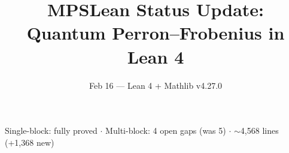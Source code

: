 \documentclass[aspectratio=169,10pt]{beamer}
\title{\textbf{MPSLean Status Update:\\Quantum Perron--Frobenius in Lean 4}}
\subtitle{{\small Feb 16 --- Lean 4 + Mathlib v4.27.0}}
\date{}
\author{}
\begin{document}
{%
\begin{frame}
    \vspace{-1.5em}
    \maketitle
    \vspace{-3em}
    \begin{center}
        {\footnotesize
            \textcolor{dimwhite}{Single-block: \textcolor{leangreen}{fully proved} $\cdot$
            Multi-block: \textcolor{amber}{4 open gaps} (was 5) $\cdot$
            $\sim$4{,}568 lines (+1{,}368 new)}}
    \end{center}
\end{frame}
}
\end{document}
